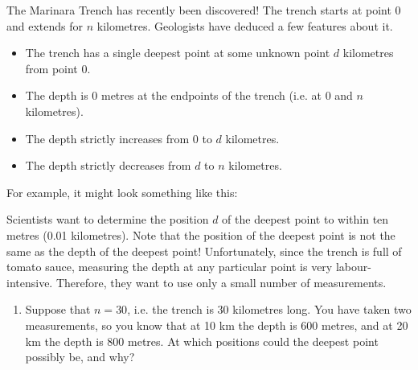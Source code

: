 \documentclass[12pt]{article}
\begin{document}

\begin{question}
The Marinara Trench has recently been discovered! The trench starts at point 0 and extends for $n$ kilometres. Geologists have deduced a few features about it.
\begin{itemize}
    \item The trench has a single deepest point at some unknown point $d$ kilometres from point 0.
    \item The depth is 0 metres at the endpoints of the trench (i.e. at 0 and $n$ kilometres).
    \item The depth strictly increases from 0 to $d$ kilometres.
    \item The depth strictly decreases from $d$ to $n$ kilometres.
\end{itemize}

For example, it might look something like this:
\begin{center}
\end{center}

Scientists want to determine the position $d$ of the deepest point to within ten metres (0.01 kilometres). Note that the position of the deepest point is not the same as the depth of the deepest point! Unfortunately, since the trench is full of tomato sauce, measuring the depth at any particular point is very labour-intensive. Therefore, they want to use only a small number of measurements.

\begin{enumerate}
    \item Suppose that $n = 30$, i.e. the trench is 30 kilometres long. You have taken two measurements, so you know that at 10 km the depth is 600 metres, and at 20 km the depth is 800 metres. At which positions could the deepest point possibly be, and why?


\end{enumerate}
\end{question}
\end{document}
